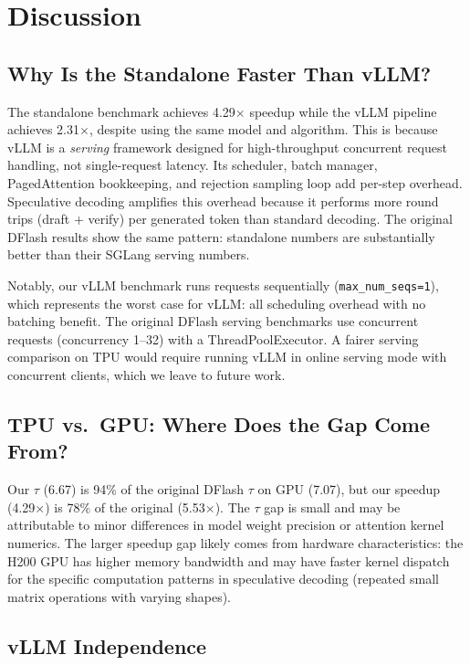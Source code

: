 \documentclass[12pt,letterpaper]{article}
\begin{document}
\section{Discussion}

\subsection{Why Is the Standalone Faster Than vLLM?}

The standalone benchmark achieves 4.29$\times$ speedup while the vLLM pipeline achieves 2.31$\times$, despite using the same model and algorithm. This is because vLLM is a \emph{serving} framework designed for high-throughput concurrent request handling, not single-request latency. Its scheduler, batch manager, PagedAttention bookkeeping, and rejection sampling loop add per-step overhead. Speculative decoding amplifies this overhead because it performs more round trips (draft + verify) per generated token than standard decoding. The original DFlash results show the same pattern: standalone numbers are substantially better than their SGLang serving numbers.

Notably, our vLLM benchmark runs requests sequentially (\texttt{max\_num\_seqs=1}), which represents the worst case for vLLM: all scheduling overhead with no batching benefit. The original DFlash serving benchmarks use concurrent requests (concurrency 1--32) with a ThreadPoolExecutor. A fairer serving comparison on TPU would require running vLLM in online serving mode with concurrent clients, which we leave to future work.

\subsection{TPU vs.\ GPU: Where Does the Gap Come From?}

Our $\tau$ (6.67) is 94\% of the original DFlash $\tau$ on GPU (7.07), but our speedup (4.29$\times$) is 78\% of the original (5.53$\times$). The $\tau$ gap is small and may be attributable to minor differences in model weight precision or attention kernel numerics. The larger speedup gap likely comes from hardware characteristics: the H200 GPU has higher memory bandwidth and may have faster kernel dispatch for the specific computation patterns in speculative decoding (repeated small matrix operations with varying shapes).

\subsection{vLLM Independence}
\end{document}
